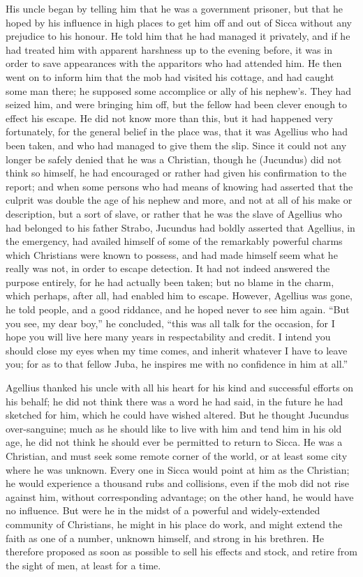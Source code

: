 His uncle began by telling him that he was a government prisoner,
but that he hoped by his influence in high places to get him off and
out of Sicca without any prejudice to his honour. He told him
that he had managed it privately, and if he had treated him with
apparent harshness up to the evening before, it was in order to save
appearances with the apparitors who had attended him. He then went on
to inform him that the mob had visited his cottage, and had caught
some man there; he supposed some accomplice or ally of his nephew's.
They had seized him, and were bringing him off, but the fellow had
been clever enough to effect his escape. He did not know more than
this, but it had happened very fortunately, for the general belief in
the place was, that it was Agellius who had been taken, and who had
managed to give them the slip. Since it could not any longer be safely
denied that he was a Christian, though he (Jucundus) did not think so
himself, he had encouraged or rather had given his confirmation to the
report; and when some persons who had means of knowing had asserted
that the culprit was double the age of his nephew and more, and not at
all of his make or description, but a sort of slave, or rather that he
was the slave of Agellius who had belonged to his father Strabo,
Jucundus had boldly asserted that Agellius, in the emergency, had
availed himself of some of the remarkably powerful charms which
Christians were known to possess, and had made himself seem what he
really was not, in order to escape detection. It had not indeed
answered the purpose entirely, for he had actually been taken; but no
blame in the charm, which perhaps, after all, had enabled him to
escape. However, Agellius was gone, he told people, and a good
riddance, and he hoped never to see him again. ``But you see, my
dear boy,'' he concluded, ``this was all talk for the
occasion, for I hope you will live here many years in respectability
and credit. I intend you should close my eyes when my time comes, and
inherit whatever I have to leave you; for as to that fellow Juba, he
inspires me with no confidence in him at all.''

Agellius thanked his uncle with all his heart for his kind and
successful efforts on his behalf; he did not think there was a word he
had said, in the future he had sketched for him, which he could have
wished altered. But he thought Jucundus over-sanguine; much as he
should like to live with him and tend him in his old age, he did not
think he should ever be permitted to return to Sicca. He was a
Christian, and must seek some remote corner of the world, or at least
some city where he was unknown. Every one in Sicca would point at him
as the Christian; he would experience a thousand rubs and collisions,
even if the mob did not rise against him, without corresponding
advantage; on the other hand, he would have no influence. But were he
in the midst of a powerful and widely-extended community of
Christians, he might in his place do work, and might extend the faith
as one of a number, unknown himself, and strong in his brethren. He
therefore proposed as soon as possible to sell his effects and
stock, and retire from the sight of men, at least for a time.

